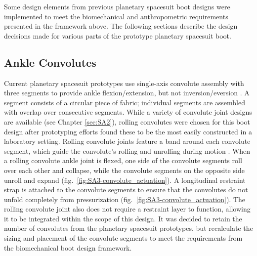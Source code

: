 \documentclass[defaultstyle,11pt]{thesis}
\begin{document}
Some design elements from previous planetary spacesuit boot designs were implemented to meet the biomechanical and anthropometric requirements presented in the framework above.
The following sections describe the design decisions made for various parts of the prototype planetary spacesuit boot.

\hypertarget{ankle-convolutes}{%
\subsection{Ankle Convolutes}\label{ankle-convolutes}}

Current planetary spacesuit prototypes use single-axis convolute assembly with three segments to provide ankle flexion/extension, but not inversion/eversion \citep{Ross2002}.
A segment consists of a circular piece of fabric; individual segments are assembled with overlap over consecutive segments.
While a variety of convolute joint designs are available (see Chapter \ref{sec:SA2}), rolling convolutes were chosen for this boot design after prototyping efforts found these to be the most easily constructed in a laboratory setting.
Rolling convolute joints feature a band around each convolute segment, which guide the convolute's rolling and unrolling during motion \citep{Harris2001}.
When a rolling convolute ankle joint is flexed, one side of the convolute segments roll over each other and collapse, while the convolute segments on the opposite side unroll and expand (fig.~\ref{fig:SA3-convolute_actuation}).
A longitudinal restraint strap is attached to the convolute segments to ensure that the convolutes do not unfold completely from pressurization (fig.~\ref{fig:SA3-convolute_actuation}).
The rolling convolute joint also does not require a restraint layer to function, allowing it to be integrated within the scope of this design.
It was decided to retain the number of convolutes from the planetary spacesuit prototypes, but recalculate the sizing and placement of the convolute segments to meet the requirements from the biomechanical boot design framework.
\end{document}
